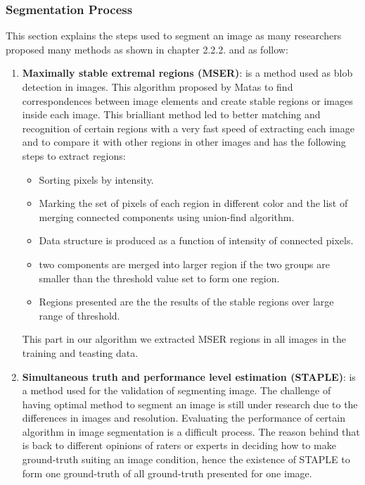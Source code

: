 \subsubsection{Segmentation Process}
This section explains the steps used to segment an image as many researchers proposed many methods as shown in chapter 2.2.2. and as follow:
\begin{enumerate}
\item\textbf{Maximally stable extremal regions (MSER)}: is a method used as blob detection in images.
This algorithm proposed by Matas \cite{matas2004robust} to find correspondences between image elements and create stable regions or images inside each image.
This brialliant method led to better matching and recognition of certain regions with a very fast speed of extracting each image and to compare it with other regions in other images and has the following steps to extract regions:
\begin{itemize}
\item Sorting pixels by intensity.
\item Marking the set of pixels of each region in different color and the list of merging connected components using union-find algorithm.
\item Data structure is produced as a function of intensity of connected pixels.
\item two components are merged into larger region if the two groups are smaller than the threshold value set to form one region.
\item Regions presented are the the results of the stable regions over large range of threshold.
\end{itemize}
This part in our algorithm we extracted MSER regions in all images in the training and teasting data.

\item\textbf{Simultaneous truth and performance level estimation (STAPLE)}: is a method used for the validation of segmenting image.
The challenge of having optimal method to segment an image is still under research due to the differences in images and resolution.
Evaluating the performance of certain algorithm in image segmentation is a difficult process.
The reason behind that is back to different opinions of raters or experts in deciding how to make ground-truth suiting an image condition, hence the existence of STAPLE to form one ground-truth of all ground-truth presented for one image.


\end{enumerate}

